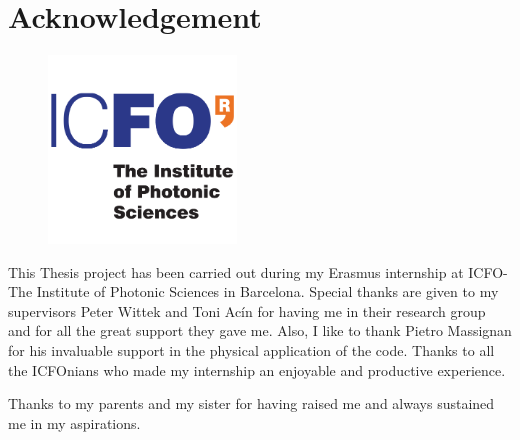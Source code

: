 \thispagestyle{empty}
\chapter*{Acknowledgement}

\begin{figure}[h!]
\centering
   \includegraphics[width=5cm]{Figs/logo_icfo.png}
\end{figure}

\noindent This Thesis project has been carried out during my Erasmus internship at ICFO-The Institute of Photonic Sciences in Barcelona. Special thanks are given to my supervisors Peter Wittek and Toni Acín for having me in their research group and for all the great support they gave me.
Also, I like to thank Pietro Massignan for his invaluable support in the physical application of the code.
Thanks to all the ICFOnians who made my internship an enjoyable and productive experience. 

\vspace{1cm}

\noindent Thanks to my parents and my sister for having raised me and always sustained me in my aspirations.